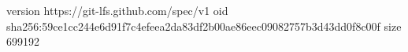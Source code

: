 version https://git-lfs.github.com/spec/v1
oid sha256:59ce1cc244e6d91f7c4efeea2da83df2b00ae86eec09082757b3d43dd0f8c00f
size 699192
